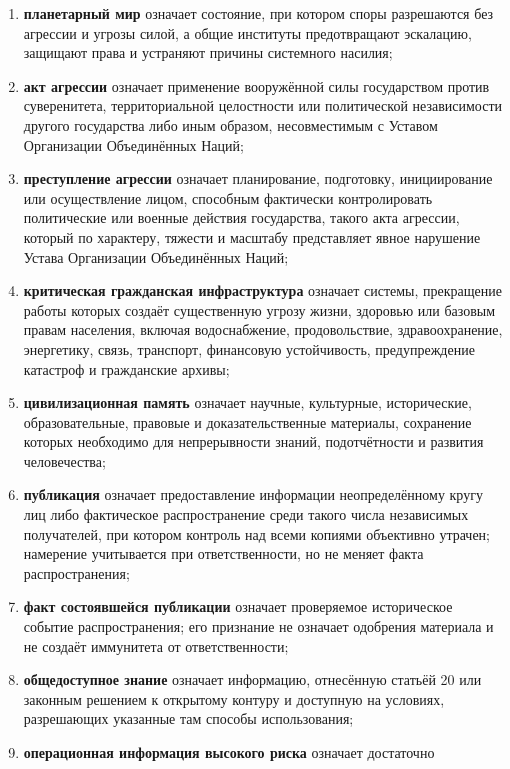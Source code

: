 \documentclass[
  russian,
  11pt,
  a4paper,
]{article}
\providecommand{\tightlist}{%
  \setlength{\itemsep}{0pt}\setlength{\parskip}{0pt}}
\begin{document}
\begin{enumerate}
\def\labelenumi{\arabic{enumi}.}
\tightlist
\item
  \textbf{планетарный мир} означает состояние, при котором споры
  разрешаются без агрессии и угрозы силой, а общие институты
  предотвращают эскалацию, защищают права и устраняют причины системного
  насилия;
\item
  \textbf{акт агрессии} означает применение вооружённой силы
  государством против суверенитета, территориальной целостности или
  политической независимости другого государства либо иным образом,
  несовместимым с Уставом Организации Объединённых Наций;
\item
  \textbf{преступление агрессии} означает планирование, подготовку,
  инициирование или осуществление лицом, способным фактически
  контролировать политические или военные действия государства, такого
  акта агрессии, который по характеру, тяжести и масштабу представляет
  явное нарушение Устава Организации Объединённых Наций;
\item
  \textbf{критическая гражданская инфраструктура} означает системы,
  прекращение работы которых создаёт существенную угрозу жизни, здоровью
  или базовым правам населения, включая водоснабжение, продовольствие,
  здравоохранение, энергетику, связь, транспорт, финансовую
  устойчивость, предупреждение катастроф и гражданские архивы;
\item
  \textbf{цивилизационная память} означает научные, культурные,
  исторические, образовательные, правовые и доказательственные
  материалы, сохранение которых необходимо для непрерывности знаний,
  подотчётности и развития человечества;
\item
  \textbf{публикация} означает предоставление информации неопределённому
  кругу лиц либо фактическое распространение среди такого числа
  независимых получателей, при котором контроль над всеми копиями
  объективно утрачен; намерение учитывается при ответственности, но не
  меняет факта распространения;
\item
  \textbf{факт состоявшейся публикации} означает проверяемое
  историческое событие распространения; его признание не означает
  одобрения материала и не создаёт иммунитета от ответственности;
\item
  \textbf{общедоступное знание} означает информацию, отнесённую статьёй
  20 или законным решением к открытому контуру и доступную на условиях,
  разрешающих указанные там способы использования;
\item
  \textbf{операционная информация высокого риска} означает достаточно

\end{enumerate}
\end{document}
